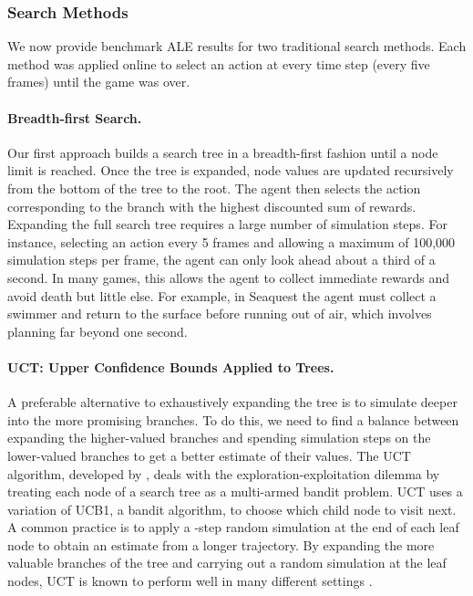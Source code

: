\documentclass[twoside,11pt]{article}
\newcommand{\gamename}[1]{{\sc #1}}
\begin{document}
\subsubsection{Search Methods}
\label{sec:planning:methods}

We now provide benchmark ALE results for two traditional search methods.
Each method was applied online to select an action at every time step (every five frames) until the game was over.

\paragraph{Breadth-first Search.}
\label{sec:agents:search:fulltree}
Our first approach builds a search tree in a breadth-first fashion until a node limit is reached.
Once the tree is expanded, node values are updated recursively from the bottom of the tree to the root. The agent then selects the action corresponding to the branch with the highest discounted sum of rewards. Expanding the full search tree requires a large number of simulation steps. 
For instance, selecting an action every 5 frames and allowing a maximum of 100,000 simulation steps per frame, the agent can only look ahead about a third of a second. 
In many games, this allows the agent to collect immediate rewards and avoid death but little else. For example, in \gamename{Seaquest} the agent must collect a swimmer and return to the surface before running out of air, which involves planning far beyond one second.

\paragraph{UCT: Upper Confidence Bounds Applied to Trees.}
\label{sec:agents:search:uct}
A preferable alternative to exhaustively expanding the tree is to simulate deeper into the more promising branches. To do this, we need to find a balance between expanding the higher-valued branches and spending simulation steps on the lower-valued branches to get a better estimate of their values. 
The UCT algorithm, developed by , deals with the exploration-exploitation dilemma by treating each node of a search tree as a multi-armed bandit problem. UCT uses a variation of UCB1, a bandit algorithm, to choose which child node to visit next. A common practice is to apply a -step random simulation at the end of each leaf node to obtain an estimate from a longer trajectory. By expanding the more valuable branches of the tree and carrying out a random simulation at the leaf nodes, UCT is known to perform well in many different settings .
 
\end{document}
